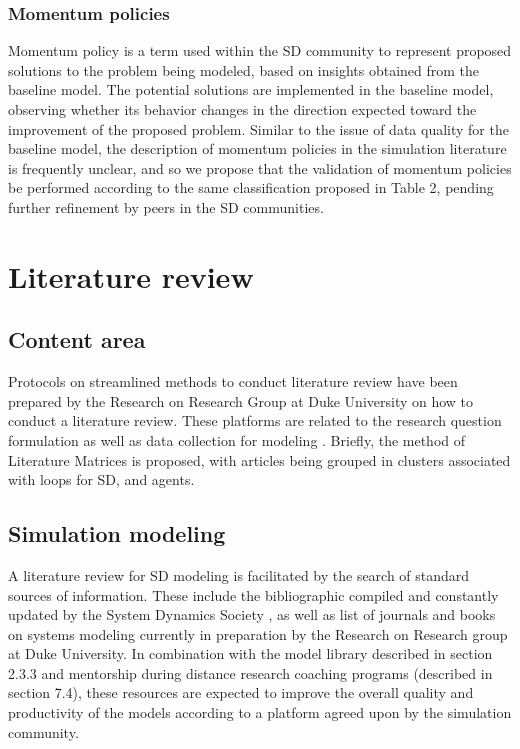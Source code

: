 \documentclass[11pt]{article}
\begin{document}
\subsubsection {Momentum policies}
Momentum policy \cite{PenaLyneis2009} is a term used within the SD community to represent proposed solutions to the problem being modeled, based on insights obtained from the baseline model.  The potential solutions are implemented in the baseline model, observing whether its behavior changes in the direction expected toward the improvement of the proposed problem.  Similar to the issue of data quality for the baseline model, the description of momentum policies in the simulation literature is frequently unclear, and so we propose that the validation of momentum policies be performed according to the same classification proposed in Table 2, pending further refinement by peers in the SD communities.

\section {Literature review}

\subsection {Content area}
Protocols on streamlined methods to conduct literature review have been prepared by the Research on Research Group at Duke University on how to conduct a literature review.  These platforms are related to the research question formulation as well as data collection for modeling \cite{researchonresearch113}.  Briefly, the method of Literature Matrices \cite{PiETROBON2004} is proposed, with articles being grouped in clusters associated with loops for SD, and agents.  

\subsection {Simulation modeling}
A literature review for  SD modeling is facilitated by the search of standard sources of information.  These include the bibliographic compiled and constantly updated by the System Dynamics Society \cite{systemdynamics-biblio}, as well as list of journals and books on systems modeling currently in preparation by the Research on Research group at Duke University.  In combination with the model library described in section 2.3.3 and mentorship during distance research coaching programs (described in section 7.4), these resources are expected to improve the overall quality and productivity of the models according to a platform agreed upon by the simulation community.
\end{document}
